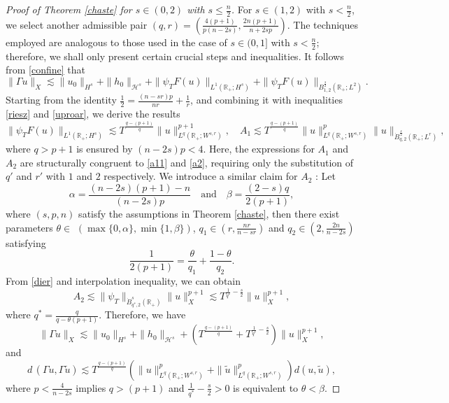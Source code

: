 \documentclass[preprint,compress,12pt]{elsarticle}
\numberwithin{equation}{section}
\begin{document}
\begin{proof}[Proof of Theorem \ref{chaste} for $s\in(0,2)$ with $s\leq \frac{n}{2}$]
	For $s\in(1,2)$ with $s<\frac{n}{2}$, we select another admissible pair $(q,r)=\left(\frac{4(p+1)}{p(n-2s)}, \frac{2n(p+1)}{n+2sp}\right)$.  The techniques employed are analogous to those used in the case of $s\in(0,1]$ with $s<\frac{n}{2}$; therefore, we shall only present certain crucial steps and inequalities. It follows from \eqref{confine} that
	\begin{equation}\label{extrude}
		\|\Gamma u\|_{X}\lesssim \|u_{0}\|_{H^{s}}+\|h_{0}\|_{\mathcal{H}^{s}}+\|\psi_{T}F(u)\|_{L^{1}(\mathbb{R}_{+};H^{s})}+\|\psi_{T}F(u)\|_{B^{\frac{s}{2}}_{1,2}(\mathbb{R}_{+};L^{2})}.
	\end{equation}
	Starting from the identity $\frac{1}{2}=\frac{(n-sr)p}{nr}+\frac{1}{r}$, and combining it with inequalities \eqref{riesz} and \eqref{uproar}, we derive the results
	\begin{equation*}
		\|\psi_{T}F(u)\|_{L^{1}(\mathbb{R}_{+};H^{s})}\lesssim T^{\frac{q-(p+1)}{q}} \|u\|_{L^{q}(\mathbb{R}_{+};W^{s,r})}^{p+1},\quad A_{1}\lesssim T^{\frac{q-(p+1)}{q}}\|u\|_{L^{q}(\mathbb{R}_{+};W^{s,r})}^{p}\|u\|_{\dot{B}^{\frac{s}{2}}_{q,2}(\mathbb{R}_{+};L^{r})},
	\end{equation*}
	where $q>p+1$ is ensured by $(n-2s)p<4$. Here, the expressions for $A_{1}$ and $A_{2}$ are structurally congruent to \eqref{a11} and \eqref{a2}, requiring only the substitution of $q'$ and $r'$ with $1$ and $2$ respectively. We introduce a similar claim for $A_{2}$ : Let
	\begin{equation}\label{die}
		\alpha=\frac{(n-2s)(p+1)-n}{(n-2s)p}\quad \text{and}\quad \beta= \frac{(2-s)q}{2(p+1)},
	\end{equation}
	where $(s, p, n)$ satisfy the assumptions in Theorem \ref{chaste}, then there exist  parameters $\theta\in$ $\left(\max\{0,\alpha\},\min\{1,\beta\}\right)$, $q_{1}\in \left(r,\frac{nr}{n-sr}\right)$ and $q_{2}\in \left(2,\frac{2n}{n-2s}\right)$ satisfying
	\begin{equation}\label{dier}
		\frac{1}{2(p+1)} =\frac{\theta}{q_{1}}+\frac{1-\theta}{q_{2}}.
	\end{equation}
	From \eqref{dier} and interpolation inequality, we can obtain
	\begin{equation*}	A_{2}\lesssim\|\psi_{T}\|_{\dot{B}^{s}_{q^{*},2}(\mathbb{R}_{+})}\|u\|_{X}^{p+1}\lesssim T^{\frac{1}{q^{*}}-\frac{s}{2}}\|u\|_{X}^{p+1},
	\end{equation*}
	where $q^{*}=\frac{q}{q-\theta(p+1)}$. Therefore, we have
	\begin{equation}
		\|\Gamma u\|_{X}\lesssim \|u_{0}\|_{H^{s}}+\|h_{0}\|_{\mathcal{H}^{s}}+\left(T^{\frac{q-(p+1)}{q}}+T^{\frac{1}{q^{*}}-\frac{s}{2}}\right)\|u\|_{X}^{p+1},
	\end{equation}
	and
	\begin{equation}\label{lave}
		d\,(\Gamma u,\Gamma\tilde{u})\lesssim T^{\frac{q-(p+1)}{q}} \left(\|u\|_{L^{q}(\mathbb{R}_{+};W^{s,r})}^{p}+\|\tilde{u}\|_{L^{q}(\mathbb{R}_{+};W^{s,r})}^{p}\right)d(u,\tilde{u}),
	\end{equation}
	where $p<\frac{4}{n-2s}$ implies $q>(p+1)$ and $\frac{1}{q^{*}}-\frac{s}{2}>0$ is equivalent to $\theta<\beta$.
	

\end{proof}
\end{document}
